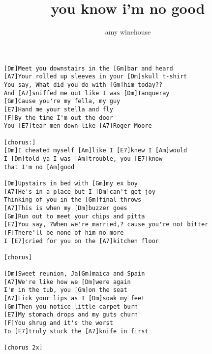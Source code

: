 \author{amy winehouse}
\title{you know i'm no good}
\maketitle
\begin{verbatim}
[Dm]Meet you downstairs in the [Gm]bar and heard
[A7]Your rolled up sleeves in your [Dm]skull t-shirt
You say, What did you do with [Gm]him today??
And [A7]sniffed me out like I was [Dm]Tanqueray
[Gm]Cause you're my fella, my guy
[E7]Hand me your stella and fly
[F]By the time I'm out the door
You [E7]tear men down like [A7]Roger Moore

[chorus:]
[Dm]I cheated myself [Am]like I [E7]knew I [Am]would
I [Dm]told ya I was [Am]trouble, you [E7]know
that I'm no [Am]good

[Dm]Upstairs in bed with [Gm]my ex boy
[A7]He's in a place but I [Dm]can't get joy
Thinking of you in the [Gm]final throws
[A7]This is when my [Dm]buzzer goes
[Gm]Run out to meet your chips and pitta
[E7]You say, ?When we're married,? cause you're not bitter
[F]There'll be none of him no more
I [E7]cried for you on the [A7]kitchen floor

[chorus]

[Dm]Sweet reunion, Ja[Gm]maica and Spain
[A7]We're like how we [Dm]were again
I'm in the tub, you [Gm]on the seat
[A7]Lick your lips as I [Dm]soak my feet
[Gm]Then you notice little carpet burn
[E7]My stomach drops and my guts churn
[F]You shrug and it's the worst
To [E7]truly stuck the [A7]knife in first

[chorus 2x]
\end{verbatim}